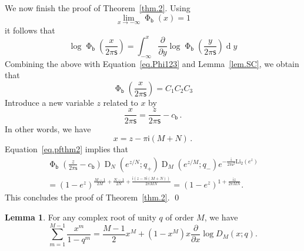 \documentclass[12pt]{amsart}
\theoremstyle{definition}
\newtheorem{lemma}[theorem]{Lemma}
\newcommand{\im}{\mathsf{i}}
\newcommand{\fad}[1]{\operatorname{\Phi}_{#1}}
\begin{document}
We now finish the proof of Theorem~\ref{thm.2}. Using
\begin{equation}
\lim_{x\to -\infty}\fad{\mathsf{b}}\!\left(x\right)=1
\end{equation}
it follows that
\begin{equation}
\label{eq.pfthm2}
\log\fad{\mathsf{b}}\!\left(\frac{x}{2\pi\mathsf{s}}\right)
=\int_{-\infty}^x \frac{\partial}{\partial y}\log\fad{\mathsf{b}}\!
\left(\frac{y}{2\pi\mathsf{s}}\right)\operatorname{d}\! y
\end{equation}
Combining the above with Equation~\eqref{eq.Phi123} and Lemma~\ref{lem.SC},
we obtain that
\begin{equation}
\fad{\mathsf{b}}\!\left(\frac{x}{2\pi\mathsf{s}}\right)=C_1C_2C_3
\end{equation}
Introduce a new variable $z$ related to $x$ by 
\begin{equation}
\frac{x}{2\pi\mathsf{s}}=\frac{z}{2\pi\mathsf{s}}-c_{\mathsf{b}} \,.
\end{equation}
In other words, we have
\begin{equation}
x=z-\pi\im(M+N) \,.
\end{equation}
Equation~\eqref{eq.pfthm2} implies that
\begin{multline}
\fad{\mathsf{b}}\!\left(\frac{z}{2\pi\mathsf{s}}-c_{\mathsf{b}}\right)
\operatorname{D}_N(e^{z/N};q_+)\operatorname{D}_M(e^{z/M};q_-)
e^{-\frac{\im}{2\pi\mathsf{s}^2}\operatorname{Li_2}(e^{z})}\\=
\left(1-e^z\right)^{\frac{M-1}{2M}+\frac{N-1}{2N}+\frac{\im (z-\pi\im(M+N))}{2\pi MN}}=
\left(1-e^z\right)^{1+\frac{\im z}{2\pi MN}}.
\end{multline}
This concludes the proof of Theorem~\ref{thm.2}.
\qed

\begin{lemma}
\label{lemim}
For any complex root of unity $q$ of order $M$, we have
\begin{equation}
\sum_{m=1}^{M-1}\frac{x^m}{1-q^m}
=\frac{M-1}{2}x^M+(1-x^M)x\frac{\partial}{\partial x}\log D_M(x; q).
\end{equation}
\end{lemma}
\end{document}
